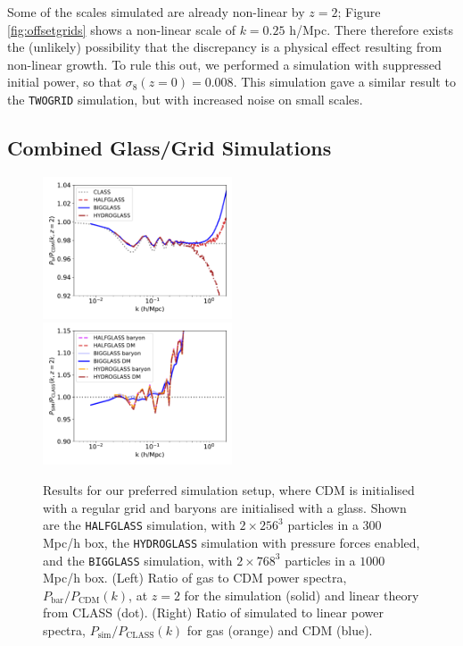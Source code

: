 \documentclass[a4paper,11pt]{article}
\begin{document}
Some of the scales simulated are already non-linear by $z=2$; Figure \ref{fig:offsetgrids} shows a non-linear scale of $k = 0.25$ h/Mpc. There therefore exists the (unlikely) possibility that the discrepancy is a physical effect resulting from non-linear growth. To rule this out, we performed a simulation with suppressed initial power, so that $\sigma_8(z=0) = 0.008$. This simulation gave a similar result to the \texttt{TWOGRID} simulation, but with increased noise on small scales.

\subsection{Combined Glass/Grid Simulations}
\label{sec:halfglass}

\begin{figure}
\includegraphics[width=0.5\textwidth]{plots/halfglass_2_relpower.pdf}
  \includegraphics[width=0.5\textwidth]{plots/halfglass_2_class.pdf}
\caption{Results for our preferred simulation setup, where CDM is initialised with a regular grid and baryons are initialised with a glass. Shown are the \texttt{HALFGLASS} simulation, with $2\times 256^3$ particles in a $300$ Mpc/h box, the \texttt{HYDROGLASS} simulation with pressure forces enabled, and the \texttt{BIGGLASS} simulation, with $2\times 768^3$ particles in a $1000$ Mpc/h box. (Left) Ratio of gas to CDM power spectra, $P_\mathrm{bar}/P_\mathrm{CDM}(k)$, at $z=2$ for the simulation (solid) and linear theory from CLASS (dot). (Right) Ratio of simulated to linear power spectra, $P_\mathrm{sim}/P_\mathrm{CLASS}(k)$ for gas (orange) and CDM (blue).}
  \label{fig:baryonglass}
\end{figure}
\end{document}
